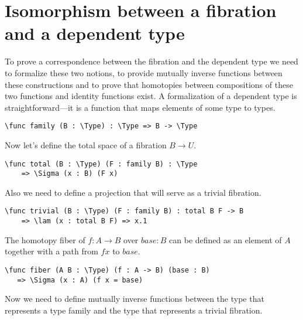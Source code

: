 \section{Isomorphism between a fibration and a dependent type}

To prove a correspondence between the fibration and the dependent type we need to formalize these two notions, to provide mutually inverse functions between these constructions and to prove that homotopies between compositions of these two functions and identity functions exist. 
A formalization of a dependent type is straightforward---it is a function that maps elements of some type to types.

\begin{ListingEnv}[H]
\begin{lstlisting}
\func family (B : \Type) : \Type => B -> \Type
\end{lstlisting}
\end{ListingEnv}

Now let's define the total space of a fibration $B \to U$.

\begin{ListingEnv}[H]
\begin{lstlisting}
\func total (B : \Type) (F : family B) : \Type 
	=> \Sigma (x : B) (F x)
\end{lstlisting}
\end{ListingEnv}

Also we need to define a projection that will serve as a trivial fibration.

\begin{ListingEnv}[H]
\begin{lstlisting}
\func trivial (B : \Type) (F : family B) : total B F -> B 
	=> \lam (x : total B F) => x.1
\end{lstlisting}
\end{ListingEnv}

The homotopy fiber of $f : A \to B$ over $base : B$ can be defined as an element of $A$ together with a path from $f x$ to $base$.

\begin{ListingEnv}[H]
\begin{lstlisting}
\func fiber (A B : \Type) (f : A -> B) (base : B)
   => \Sigma (x : A) (f x = base)
\end{lstlisting}
\end{ListingEnv}

Now we need to define mutually inverse functions between the type that represents a type family and the type that represents a trivial fibration. 
  
